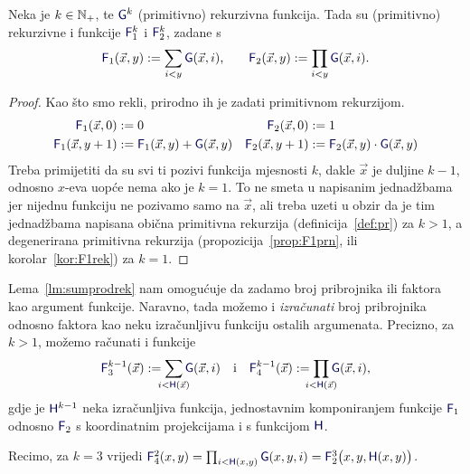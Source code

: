 \begin{lema}\label{lm:sumprodrek}
    Neka je $k\in{\mathbb N}_+$, te $\f G^k$\! (primitivno) rekurzivna funkcija. Tada su (primitivno) rekurzivne i funkcije $\f F_1^k$ i $\f F_2^k$, zadane s
\begin{equation}
    \f F_1(\vec x,y):=\sum_{i<y}\f G(\vec x,i)\text,\qquad
    \f F_2(\vec x,y):=\prod_{i<y}\f G(\vec x,i)\text.
\end{equation}
\end{lema}
\begin{proof}
    Kao što smo rekli, prirodno ih je zadati primitivnom rekurzijom.
    \begin{align}
        \label{eq:sumG1}\f F_1(\vec x,0)&:=0&\f F_2(\vec x,0)&:=1
        \\
        \label{eq:sumH1}
        \f F_1(\vec x,y+1)&:=\f F_1(\vec x,y)+\f G(\vec x,y)&
        \f F_2(\vec x,y+1)&:=\f F_2(\vec x,y)\cdot\f G(\vec x,y)
    \end{align}
Treba primijetiti da su svi ti pozivi funkcija mjesnosti $k$, dakle $\vec x$ je duljine $k-1$, odnosno $x$-eva uopće nema ako je $k=1$. To ne smeta u napisanim jednadžbama jer nijednu funkciju ne pozivamo samo na $\vec x$, ali treba uzeti u obzir da je tim jednadžbama napisana obična primitivna rekurzija (definicija~\ref{def:pr}) za $k>1$, a degenerirana primitivna rekurzija (propozicija~\ref{prop:F1prn}, ili korolar~\ref{kor:F1rek}) za $k=1$.
\end{proof}

\begin{napomena}\label{nap:sumprodH}
    Lema~\ref{lm:sumprodrek} nam omogućuje da zadamo broj pribrojnika ili faktora kao argument funkcije. Naravno, tada možemo i \emph{izračunati} broj pribrojnika odnosno faktora kao neku izračunljivu funkciju ostalih argumenata. Precizno, za $k>1$, možemo računati i funkcije
\begin{equation}
    \f F_3^{k-1}(\vec x):=\sum_{\mathclap{i<\f H(\vec x)}}\f G(\vec x,i)
    \text{\quad i\quad}\f F_4^{k-1}(\vec x):=\prod_{\mathclap{i<\f H(\vec x)}}\f G(\vec x,i)\text,
\end{equation}
gdje je $\f H^{k-1}$ neka izračunljiva funkcija, jednostavnim komponiranjem funkcije $\f F_1$ odnosno $\f F_2$ s koordinatnim projekcijama i s funkcijom $\f H$.

Recimo, za $k=3$ vrijedi $\f F_4^2(x,y)=\prod_{i<\f H(x,y)}\f G(x,y,i)=\f F_2^3\bigl(x,y,\f H(x,y)\bigr)$.
\end{napomena}

